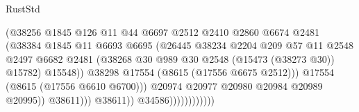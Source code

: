 \begin{lexlean}{RustStd}
\begin{coremodule}
                                            (@38256
                                              @1845
                                              @126
                                              @11
                                              @44
                                              @6697
                                              @2512
                                              @2410
                                              @2860
                                              @6674
                                              @2481
                                              (@38384
                                                @1845
                                                @11
                                                @6693
                                                @6695
                                                (@26445
                                                  @38234
                                                  @2204
                                                  @209
                                                  @57
                                                  @11
                                                  @2548
                                                  @2497
                                                  @6682
                                                  @2481
                                                  (@38268
                                                    @30
                                                    @989
                                                    @30
                                                    @2548
                                                    (@15473 (@38273 @30))
                                                    @15782)
                                                  @15548))
                                              @38298
                                              @17554
                                              (@8615 (@17556 @6675 @2512)))
                                            @17554
                                            (@8615 (@17556 @6610 @6700)))
                                          @20974
                                          @20977
                                          @20980
                                          @20984
                                          @20989
                                          @20995))
                                      @38611)))
                                @38611))
                            @34586))))))))))))

\end{coremodule}
\end{lexlean}
